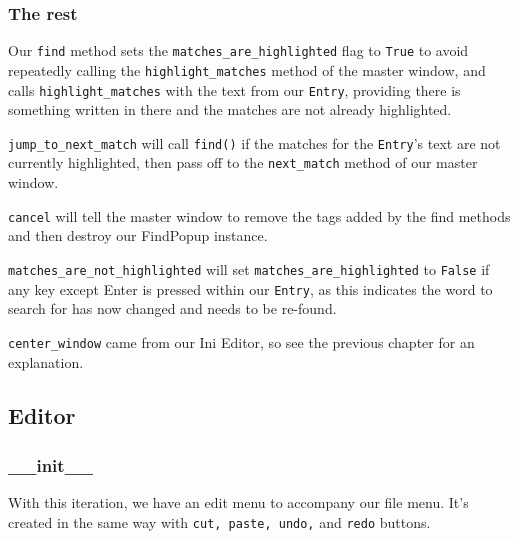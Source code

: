\documentclass[a4paper,11pt,openany]{book}
\begin{document}
\subsubsection{The rest}

Our \lstinline[columns=fixed]{find} method sets the \lstinline[columns=fixed]{matches_are_highlighted} flag to \lstinline[columns=fixed]{True} to avoid repeatedly calling the \lstinline[columns=fixed]{highlight_matches} method of the master window, and calls \lstinline[columns=fixed]{highlight_matches} with the text from our \lstinline[columns=fixed]{Entry}, providing there is something written in there and the matches are not already highlighted. 

\vspace{5mm}

\lstinline[columns=fixed]{jump_to_next_match} will call \lstinline[columns=fixed]{find()} if the matches for the \lstinline[columns=fixed]{Entry}'s text are not currently highlighted, then pass off to the \lstinline[columns=fixed]{next_match} method of our master window. 

\vspace{5mm}

\lstinline[columns=fixed]{cancel} will tell the master window to remove the tags added by the find methods and then destroy our FindPopup instance. 

\vspace{5mm}

\lstinline[columns=fixed]{matches_are_not_highlighted} will set \lstinline[columns=fixed]{matches_are_highlighted} to \lstinline[columns=fixed]{False} if any key except Enter is pressed within our \lstinline[columns=fixed]{Entry}, as this indicates the word to search for has now changed and needs to be re-found. 

\vspace{5mm}

\lstinline[columns=fixed]{center_window} came from our Ini Editor, so see the previous chapter for an explanation.

\subsection{Editor}

\subsubsection{\_\_init\_\_}

With this iteration, we have an edit menu to accompany our file menu. It's created in the same way with \lstinline[columns=fixed]{cut, paste, undo,} and \lstinline[columns=fixed]{redo} buttons. 
\end{document}
